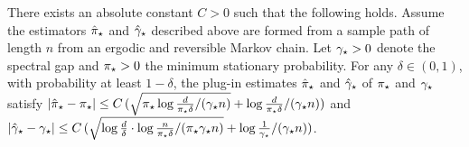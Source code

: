 \begin{theorem}
  \label{thm:err}
  There exists an absolute constant $C>0$ such that the following
  holds.
  Assume the estimators $\hat\pi_{\star}$ and $\hat\gamma_{\star}$ described above are
  formed from a sample path of length $n$ from an ergodic and
  reversible Markov chain.
  Let $\gamma_{\star}>0$ denote the spectral gap and $\pi_{\star}>0$ the minimum
  stationary probability.
  For any $\delta \in (0,1)$, with probability at least $1-\delta$,
  the plug-in estimates $\hat\pi_{\star}$ and $\hat\gamma_{\star}$ of $\pi_{\star}$ and
  $\gamma_{\star}$ satisfy
   $\left|\hat\pi_{\star}-\pi_{\star}\right|
    \le
    C \,
    (
      \sqrt{\pi_{\star}\log\frac{d}{\pi_{\star}\delta}/(\gamma_{\star} n)}
      +
      \log\frac{d}{\pi_{\star}\delta}/(\gamma_{\star} n)
    )$
  and
   $\left|\hat\gamma_{\star}-\gamma_{\star}\right|
    \leq
    C \,
    (
      \sqrt{\log\frac{d}{\delta}\cdot\log\frac{n}{\pi_{\star}\delta}/(\pi_{\star}\gamma_{\star} n)}
      + \log\frac{1}{\gamma_{\star}}/(\gamma_{\star} n)
    )$.
\end{theorem}



